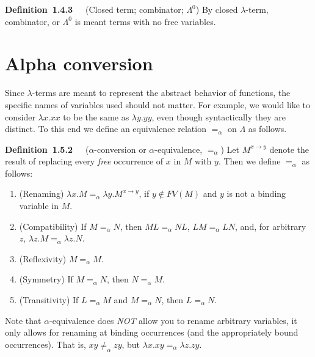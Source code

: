 \documentclass[letterpaper]{article}
\newenvironment{definition}[2][]{\par\medskip
	\noindent \textbf{Definition~#2}~~~#1 \rmfamily}{\medskip}
\renewcommand{\l}{\lambda}
\newcommand{\aeq}{=_\alpha}
\newcommand{\naeq}{\neq_\alpha}
\begin{document}
\begin{definition}[(Closed term; combinator; $\Lambda^0$)]{1.4.3}
	By closed $\lambda$-term, combinator, or $\Lambda^0$ is meant terms with no free variables.
\end{definition}

\section{Alpha conversion}

Since $\lambda$-terms are meant to represent the abstract behavior of functions, the specific names of variables used should not matter. For example, we would like to consider $\lambda x . x x$ to be the same as $\lambda y . y y$, even though syntactically they are distinct. To this end we define an equivalence relation $=_\alpha$ on $\Lambda$ as follows.

\begin{definition}[($\alpha$-conversion or $\alpha$-equivalence, $=_\alpha$)]{1.5.2}
	Let $M^{x \to y}$ denote the result of replacing every \emph{free} occurrence of $x$ in $M$ with $y$. Then we define $=_\alpha$ as follows:
	\begin{enumerate}
		\item (Renaming) $\l x. M =_\alpha \l y . M^{x \to y}$, if $y \not \in FV(M)$ and $y$ is not a binding variable in $M$.
		\item (Compatibility) If $M =_\alpha N$, then $M L =_\alpha N L$, $L M =_\alpha L N$, and, for arbitrary $z$, $\lambda z . M =_\alpha \lambda z . N$.
		\item (Reflexivity) $M =_\alpha M$.
		\item (Symmetry) If $M =_\alpha N$, then $N =_\alpha M$.
		\item (Transitivity) If $L =_\alpha M$ and $M =_\alpha N$, then $L =_\alpha N$.
	\end{enumerate}
\end{definition}
Note that $\alpha$-equivalence does \emph{NOT} allow you to rename arbitrary variables, it only allows for renaming at binding occurrences (and the appropriately bound occurrences). That is, $x y \naeq z y$, but $\l x . x y \aeq \l z. z y$.
\end{document}
